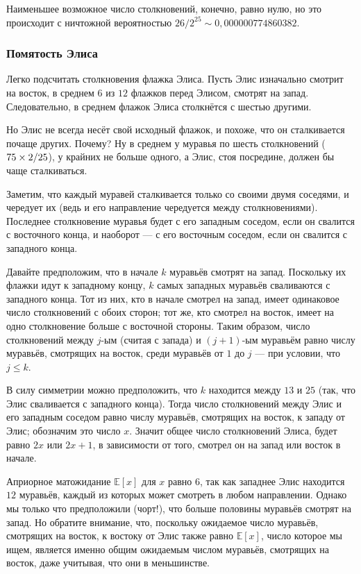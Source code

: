 Наименьшее возможное число столкновений, конечно, равно нулю, но это происходит с ничтожной вероятностью $26/2^{25} \sim 0{,}000000774860382$.


\subsubsection*{Помятость Элиса}

Легко подсчитать столкновения флажка Элиса.
Пусть Элис изначально смотрит на восток, в среднем $6$ из $12$ флажков перед Элисом, смотрят на запад.
Следовательно, в среднем  флажок Элиса столкнётся с шестью другими.

Но Элис не всегда несёт свой исходный флажок, и похоже, что он сталкивается почаще других.
Почему?
Ну в среднем у муравья по шесть столкновений ($75 \z\times 2/25$), у крайних не больше одного, а Элис, стоя посредине, должен бы чаще сталкиваться.

Заметим, что каждый муравей сталкивается только со своими двумя соседями,
и чередует их (ведь и его направление чередуется между столкновениями).
Последнее столкновение муравья будет с его западным соседом, если он свалится с восточного конца, и наоборот --- с его восточным соседом, если он свалится с западного конца.

Давайте предположим, что в начале $k$ муравьёв смотрят на запад.
Поскольку их флажки идут к западному концу, $k$ самых западных муравьёв сваливаются с западного конца.
Тот из них, кто в начале смотрел на запад, имеет одинаковое число столкновений с обоих сторон;
тот же, кто смотрел на восток, имеет на одно столкновение больше с восточной стороны.
Таким образом, число столкновений между $j$-ым  (считая с запада) и 
$(j+1)$-ым муравьём равно числу муравьёв, смотрящих на восток, среди муравьёв от $1$ до $j$ --- при условии, что $j\le k$.

В силу симметрии можно предположить, что $k$ находится между $13$ и $25$ (так, что Элис сваливается с западного конца).
Тогда число столкновений между Элис и его западным соседом равно числу муравьёв, смотрящих на восток, к западу от Элис; обозначим это число $x$.
Значит общее число столкновений Элиса, будет равно $2x$ или $2x+1$, в зависимости от того, смотрел он на запад или восток в начале.

Априорное матожидание $\mathbb{E}[x]$ для $x$ равно $6$, так как западнее Элис находится $12$ муравьёв, каждый из которых может смотреть в любом направлении.
Однако мы только что предположили (чорт!), что больше половины муравьёв смотрят на запад.
Но обратите внимание, что, поскольку ожидаемое число муравьёв, смотрящих на восток, к востоку от Элис также равно $\mathbb{E}[x]$, число которое мы ищем, является именно общим ожидаемым числом муравьёв, смотрящих на восток, даже учитывая, что они в меньшинстве.

